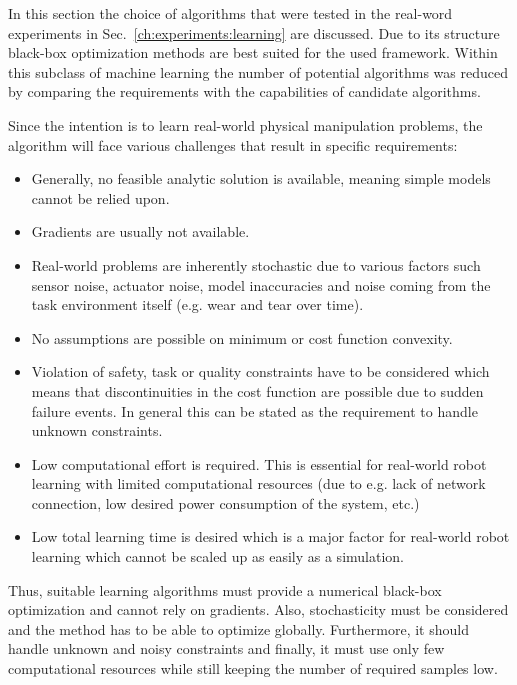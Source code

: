 In this section the choice of algorithms that were tested in the real-word experiments in Sec.~\ref{ch:experiments:learning} are discussed.
Due to its structure black-box optimization methods are best suited for the used \skillmodelabbr{} framework. 
Within this subclass of machine learning the number of potential algorithms was reduced by comparing the requirements with the capabilities of candidate algorithms.

Since the intention is to learn real-world physical manipulation problems, the algorithm will face various challenges that result in specific requirements:
\begin{itemize}
\item Generally, no feasible analytic solution is available, meaning simple models cannot be relied upon.
\item Gradients are usually not available.
\item Real-world problems are inherently stochastic due to various factors such sensor noise, actuator noise, model inaccuracies and noise coming from the task environment itself (e.g. wear and tear over time).
\item No assumptions are possible on minimum or cost function convexity.
\item Violation of safety, task or quality constraints have to be considered which means that discontinuities in the cost function are possible due to sudden failure events. In general this can be stated as the requirement to handle unknown constraints.
\item Low computational effort is required.
This is essential for real-world robot learning with limited computational resources (due to e.g. lack of network connection, low desired power consumption of the system, etc.)
\item Low total learning time is desired which is a major factor for real-world robot learning which cannot be scaled up as easily as a simulation.
\end{itemize}

Thus, suitable learning algorithms must provide a numerical black-box optimization and cannot rely on gradients.
Also, stochasticity must be considered and the method has to be able to optimize globally.
Furthermore, it should handle unknown and noisy constraints and finally, it must use only few computational resources while still keeping the number of required samples low.


